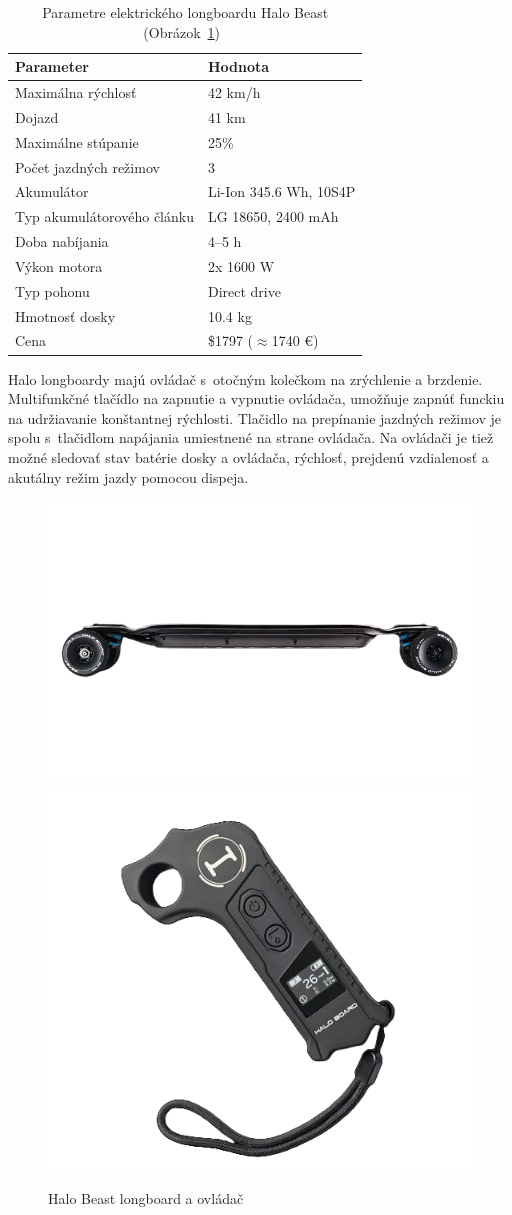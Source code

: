 \begin{table}[h]
    \centering
    \begin{tabular}{|l|l|}
        \hline
        \textbf{Parameter} & \textbf{Hodnota} \\ \hline
        Maximálna rýchlosť & 42 km/h \\ \hline
        Dojazd & 41 km \\ \hline
        Maximálne stúpanie & 25\% \\ \hline
        Počet jazdných režimov & 3 \\ \hline
        Akumulátor & Li-Ion 345.6 Wh, 10S4P \\ \hline
        Typ akumulátorového článku & LG 18650, 2400 mAh \\ \hline
        Doba nabíjania & 4--5 h \\ \hline
        Výkon motora & 2x 1600 W \\ \hline
        Typ pohonu & Direct drive \\ \hline
        Hmotnosť dosky & 10.4 kg \\ \hline
        Cena & \$1797 ($\approx$1740 €) \\ \hline
    \end{tabular}
    \caption{Parametre elektrického longboardu Halo Beast (Obrázok~\ref{fig:halo})~\cite{Halo}}\label{tab:halo}
\end{table}

Halo longboardy majú ovládač s~otočným kolečkom na zrýchlenie a brzdenie.
Multifunkčné tlačídlo na zapnutie a vypnutie ovládača, umožňuje zapnúť funckiu na udržiavanie konštantnej rýchlosti.
Tlačidlo na prepínanie jazdných režimov je spolu s~tlačidlom napájania umiestnené na strane ovládača.
Na ovládači je tiež možné sledovať stav batérie dosky a ovládača, rýchlosť, prejdenú vzdialenosť a akutálny režim jazdy pomocou dispeja.

\begin{figure}[h]
    \centering
    \includegraphics[width=0.48\linewidth]{figures/brand-reviews/halo-longboard.png}\hfill
    \includegraphics[width=0.48\linewidth]{figures/brand-reviews/halo-controller.png}
    \caption{Halo Beast longboard a ovládač\cite{Halo}}\label{fig:halo}
\end{figure}

